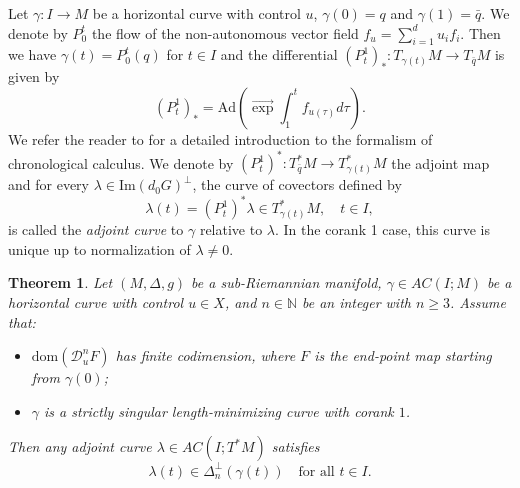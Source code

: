\documentclass[12pt, reqno]{amsart}
\theoremstyle{plain}
\newtheorem {theorem}{Theorem}[section]
\theoremstyle{definition}
\theoremstyle{remark}
\numberwithin{equation}{section}
\newcommand{\N}{\mathbb{N}}
\newcommand{\0}{\theta}
\newcommand{\la}{\lambda}
\newcommand{\1}{{-1}}
\newcommand{\q}{\bar q}
\renewcommand{\=}{\coloneqq}
\renewcommand{\.}{\dots}
\newcommand{\eexp}{\overrightarrow{\exp}}
\newcommand{\mc}{\mathcal}
\newcommand{\IM}{\mathrm{Im}}
\newcommand{\dom}{\mathrm{dom}}
\newcommand{\be}{\begin{equation}}
\newcommand{\ee}{\end{equation}}
\begin{document}
 
 
Let $\gamma: I \to M$ be a horizontal curve with control $u$,   $\gamma(0) = q$ and $\gamma(1) = \q $. 
We denote by $P_{0}^t	$ the flow of the non-autonomous vector field $f_{u}= \sum_{i=1}^ d u_i f_i$. 
Then we have $\gamma(t) = P_0^t(q)$ for $t\in I $ and the differential $(P_t^{1})_*:
T_{\gamma(t)}M \to  T_{\q }M$ is given by 
\[
	(P_t^{1 })_*= %
	\mathrm{Ad}\left(\eexp\int_1^t f_{u(\tau)}d\tau\right).
\]
We refer the reader to \cite[Chapter 2]{AgrSac} for a detailed introduction to the formalism of chronological calculus.
We denote by $(P_t^{1})^*: T^*_{\q }M\to T_{\gamma (t)}^*M$ the  adjoint map and for every   $\lambda\in \IM(d_0G)^\perp$, the curve of covectors defined by 
\be\label{AGG}
\lambda(t)=(P_t^{1})^*\lambda\in T_{\gamma(t)}^*M,
\quad  t\in  I ,
\ee
is called the \emph{adjoint curve}  to $\gamma$ relative to $\lambda$. In the corank 1 case, this curve is unique  up to normalization of $\lambda \neq 0$.





\begin{theorem}
 \label{Gohn}
 Let $(M,\Delta,g)$ be a sub-Riemannian manifold,   $\gamma \in AC ( I ; M)$ be a horizontal curve with control $u\in X$, and   $n\in\N$ be an integer with $n\geq 3$.
 Assume that:
 \begin{itemize}
 \item[i)] { \color{black} $\dom(\mc{D}^n_u F)$ has finite codimension}, where  $F$ is the end-point map starting from $\gamma(0)$;
 
 \item[ii)] $\gamma$ is a strictly singular length-minimizing curve with corank $1$.
 \end{itemize}
 \noindent
 Then any  
 adjoint curve $\la \in AC( I ;  T^*M)$ satisfies 
 \begin{equation}
 \label{DELTA}
 \lambda(t) \in \Delta_n^\perp(\gamma(t)) \quad \textrm{for all  $t\in I $}.
 \end{equation} 
 \end{theorem}
\end{document}
